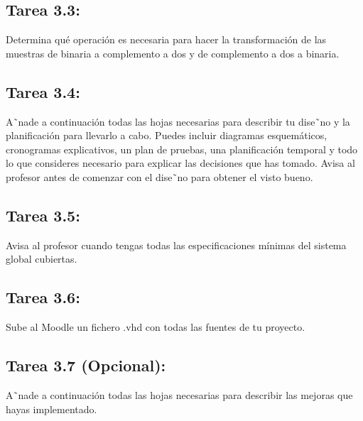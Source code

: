 \documentclass{article}
\begin{document}
\subsection{Tarea 3.3:}
Determina qué operación es necesaria para hacer la transformación de las muestras de binaria a complemento a dos y de complemento a dos a binaria.

\subsection{Tarea 3.4:}
A˜nade a continuación todas las hojas necesarias para describir tu dise˜no y la planificación para llevarlo a cabo. Puedes incluir diagramas esquemáticos, cronogramas explicativos, un plan de pruebas, una planificación temporal y todo lo que consideres necesario para explicar las decisiones que has tomado.
Avisa al profesor antes de comenzar con el dise˜no para obtener el visto bueno.

\subsection{Tarea 3.5:}
Avisa al profesor cuando tengas todas las especificaciones mínimas del sistema global cubiertas.

\subsection{Tarea 3.6:
}
Sube al Moodle un fichero .vhd con todas las fuentes de tu proyecto.

\subsection{Tarea 3.7 (Opcional):}
A˜nade a continuación todas las hojas necesarias para describir las mejoras que hayas implementado.
\end{document}
